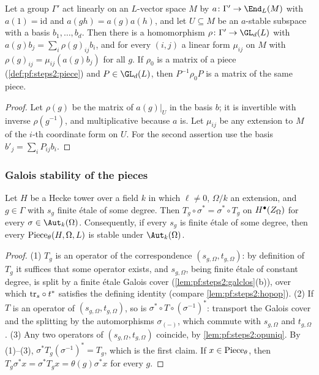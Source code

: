 \begin{lemma}\label{lem:pf:steps2:matex}
Let a group $\Gamma'$ act linearly on an $L$-vector space $M$ by $a\colon\Gamma'\to\End_L(M)$ with
$a(1)=\mathrm{id}$ and $a(gh)=a(g)a(h)$, and let $U\subseteq M$ be an $a$-stable subspace with a
basis $b_1,\dots,b_d$. Then there is a homomorphism $\rho\colon\Gamma'\to\GL_d(L)$ with
$a(g)b_j=\sum_i\rho(g)_{ij}b_i$, and for every $(i,j)$ a linear form $\mu_{ij}$ on $M$ with
$\rho(g)_{ij}=\mu_{ij}(a(g)b_j)$ for all $g$. If $\rho_0$ is a matrix of a piece
(\cref{def:pf:steps2:piece}) and $P\in\GL_d(L)$, then $P^{-1}\rho_0P$ is a matrix of the same piece.
\end{lemma}

\begin{proof}
Let $\rho(g)$ be the matrix of $a(g)|_U$ in the basis $b$; it is invertible with inverse
$\rho(g^{-1})$, and multiplicative because $a$ is. Let $\mu_{ij}$ be any extension to $M$ of the
$i$-th coordinate form on $U$. For the second assertion use the basis $b'_j=\sum_iP_{ij}b_i$.
\end{proof}

\subsubsection{Galois stability of the pieces}

\begin{lemma}\label{lem:pf:steps2:hopgal}
Let $H$ be a Hecke tower over a field $k$ in which $\ell\ne0$, $\Omega/k$ an extension, and
$g\in\Gamma$ with $s_g$ finite \'etale of some degree. Then $T_g\circ\sigma^\ast=\sigma^\ast\circ T_g$
on $H^{\bullet}(Z_\Omega)$ for every $\sigma\in\Aut_k(\Omega)$. Consequently, if every $s_g$ is finite
\'etale of some degree, then every $\mathrm{Piece}_\theta(H,\Omega,L)$ is stable under $\Aut_k(\Omega)$.
\end{lemma}

\begin{proof}
(1) $T_g$ is an operator of the correspondence $(s_{g,\Omega},t_{g,\Omega})$: by definition of $T_g$ it
suffices that some operator exists, and $s_{g,\Omega}$, being finite \'etale of constant degree, is
split by a finite \'etale Galois cover (\cref{lem:pf:steps2:galclos}(b)), over which $\mathrm{tr}_s\circ t^\ast$ satisfies the defining
identity (compare \cref{lem:pf:steps2:hopop}).
(2) If $T$ is an operator of $(s_{g,\Omega},t_{g,\Omega})$, so is $\sigma^\ast\circ
T\circ(\sigma^{-1})^\ast$: transport the Galois cover and the splitting by the automorphisms
$\sigma_{(-)}$, which commute with $s_{g,\Omega}$ and $t_{g,\Omega}$.
(3) Any two operators of $(s_{g,\Omega},t_{g,\Omega})$ coincide, by \cref{lem:pf:steps2:opuniq}.
By (1)--(3), $\sigma^\ast T_g(\sigma^{-1})^\ast=T_g$, which is the first claim. If $x\in
\mathrm{Piece}_\theta$, then $T_g\sigma^\ast x=\sigma^\ast T_gx=\theta(g)\sigma^\ast x$ for every $g$.
\end{proof}

